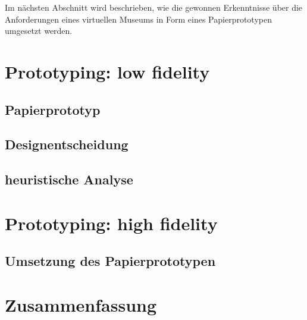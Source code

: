 \documentclass[runningheads,a4paper]{llncs}
\begin{document}





Im nächsten Abschnitt wird beschrieben, wie die gewonnen Erkenntnisse über die Anforderungen eines virtuellen Museums in Form eines Papierprototypen umgesetzt werden.\\

\section{Prototyping: low fidelity}
\subsection{Papierprototyp}
\subsection{Designentscheidung}
\subsection{heuristische Analyse}

\section{Prototyping: high fidelity}
\subsection{Umsetzung des Papierprototypen}

\section{Zusammenfassung}


\newpage
 

\end{document}
